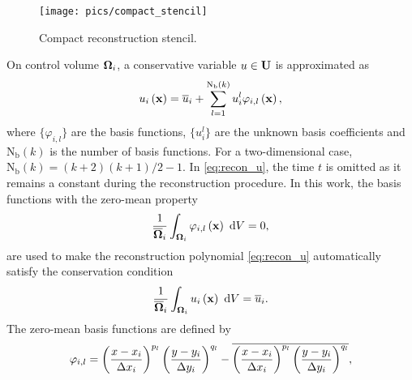 \begin{figure}[htbp!]
	\centering
	\texttt{[image: pics/compact\_stencil]}
	\caption{Compact reconstruction stencil.}
	\label{fig:compactstencil}
\end{figure}

On control volume $\mathbf{\Omega}_i$, a conservative variable $u \in \mathbf{U}$ is approximated as
\begin{equation}
	\label{eq:recon_u}
	u_i \left(\mathbf{x}\right)= \overline{u}_i + \sum^{\mathrm{N_b}\left(k\right)}_{l=1} u_i^l \varphi_{i,l} \left(\mathbf{x}\right), 
\end{equation}
where $\{\varphi_{i,l}\}$ are the basis functions, $\{u^l_i\}$ are the unknown basis coefficients and $\mathrm{N_b}(k)$ is the number of basis functions. For a two-dimensional case, $\mathrm{N_b}(k)=  (k+2)(k+1)/2 -1$. In \eqref{eq:recon_u}, the time $t$ is omitted as it remains a constant during the reconstruction procedure.
In this work, the basis functions with the zero-mean property
\begin{equation}
	\frac{1}{\overline{\mathbf{\Omega}}_i} \int_{\mathbf{\Omega}_i} \varphi_{i,l} \left(\mathbf{x}\right) \ \dd V=0,
\end{equation}
are used to make the reconstruction polynomial \eqref{eq:recon_u} automatically satisfy the conservation condition
\begin{equation}
	\label{eq:zero-mean}
	\frac{1}{\overline{\mathbf{\Omega}}_i}\int_{\mathbf{\Omega}_i}u_i \left(\mathbf{x}\right)\ \dd V= \overline{u}_i.
\end{equation}
The zero-mean basis functions are defined by
\begin{equation}
        \varphi_{i,l} =
        \left(\frac{x - x_{i}}{\mathrm\Delta x_i}\right)^{p_l}
        \left(\frac{y - y_{i}}{\mathrm\Delta y_i}\right)^{q_l}
        -
        \overline{
            \left(\frac{x - x_{i}}{\mathrm\Delta x_i}\right)^{p_l}
            \left(\frac{y - y_{i}}{\mathrm\Delta y_i}\right)^{q_l}
        }, 
\end{equation}
